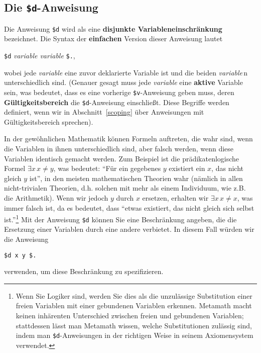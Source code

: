 \subsection{Die \texttt{\$d}-Anweisung}\label{dollard}

Die Anweisung \texttt{\$d} wird als eine {\bf disjunkte Variableneinschränkung} be\-zeich\-net.  Die Syntax der {\bf einfachen} Version dieser Anweisung lautet
\begin{center}
  \texttt{\$d} {\em variable variable} \texttt{\$.},
\end{center}
wobei jede {\em variable} eine zuvor deklarierte Variable ist und die beiden {\em variable}\,n unterschiedlich sind.  (Genauer gesagt muss jede {\em variable} eine {\bf aktive} Variable sein, was bedeutet, dass es eine vorherige \texttt{\$v}-Anweisung geben muss, deren {\bf Gültigkeitsbereich} die \texttt{\$d}-Anweisung einschließt.  Diese Begriffe werden definiert, wenn wir in Abschnitt~\ref{scoping} über Anweisungen mit Gültigkeitsbereich sprechen).

In der gewöhnlichen Mathematik können Formeln auftreten, die wahr sind, wenn die Variablen in ihnen unterschiedlich sind, aber falsch werden, wenn diese Variablen identisch gemacht werden. Zum Beispiel ist die prädikatenlogische Formel $\exists x\,x \neq y$, was bedeutet: "`Für ein gegebenes $y$ existiert ein $x$, das nicht gleich $y$ ist"', in den meisten mathematischen Theorien wahr (nämlich in allen nicht-trivialen Theorien, d.h. solchen mit mehr als einem Individuum, wie z.B. die Arithmetik).  Wenn wir jedoch $y$ durch $x$ ersetzen, erhalten wir $\exists x\,x \neq x$, was immer falsch ist, da es bedeutet, dass "`etwas existiert, das nicht gleich sich selbst ist."'\footnote{Wenn Sie Logiker sind, werden Sie dies als die unzulässige Substitution einer freien Variablen mit einer gebundenen Variablen erkennen.  Metamath macht keinen inhärenten Unterschied zwischen freien und gebundenen Variablen; stattdessen lässt man Metamath wissen, welche Substitutionen zulässig sind, indem man \texttt{\$d}-Anweisungen in der richtigen Weise in seinem Axiomensystem verwendet.}  Mit der Anweisung \texttt{\$d} können Sie eine Beschränkung angeben, die die Ersetzung einer Variablen durch eine andere verbietet.  In diesem Fall würden wir die Anweisung
\begin{center}
  \texttt{\$d x y \$.}
\end{center}
verwenden, um diese Beschränkung zu spezifizieren.

